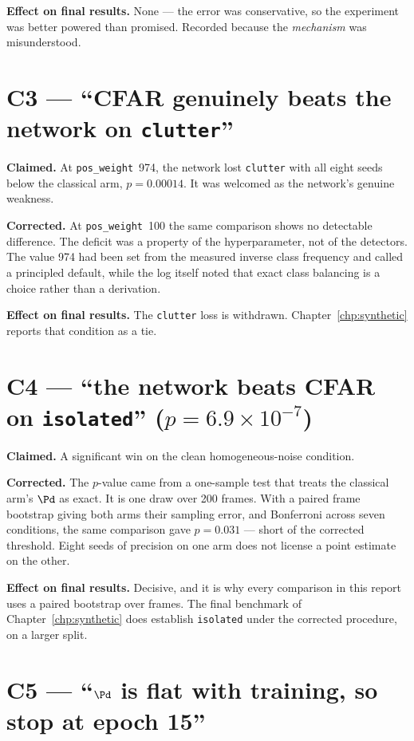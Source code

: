 \textbf{Effect on final results.} None --- the error was conservative, so the experiment was better
powered than promised. Recorded because the \emph{mechanism} was misunderstood.

\section{C3 --- ``CFAR genuinely beats the network on \texttt{clutter}''}

\textbf{Claimed.} At \texttt{pos\_weight}~974, the network lost \texttt{clutter} with all eight
seeds below the classical arm, $p = 0.00014$. It was welcomed as the network's genuine weakness.

\textbf{Corrected.} At \texttt{pos\_weight}~100 the same comparison shows no detectable difference.
The deficit was a property of the hyperparameter, not of the detectors. The value 974 had been set
from the measured inverse class frequency and called a principled default, while the log itself
noted that exact class balancing is a choice rather than a derivation.

\textbf{Effect on final results.} The \texttt{clutter} loss is withdrawn. Chapter~\ref{chp:synthetic}
reports that condition as a tie.

\section{C4 --- ``the network beats CFAR on \texttt{isolated}'' ($p = 6.9\times10^{-7}$)}

\textbf{Claimed.} A significant win on the clean homogeneous-noise condition.

\textbf{Corrected.} The $p$-value came from a one-sample test that treats the classical arm's $\Pd$
as exact. It is one draw over 200 frames. With a paired frame bootstrap giving both arms their
sampling error, and Bonferroni across seven conditions, the same comparison gave $p = 0.031$ ---
short of the corrected threshold. Eight seeds of precision on one arm does not license a point
estimate on the other.

\textbf{Effect on final results.} Decisive, and it is why every comparison in this report uses a
paired bootstrap over frames. The final benchmark of Chapter~\ref{chp:synthetic} does establish
\texttt{isolated} under the corrected procedure, on a larger split.

\section{C5 --- ``$\Pd$ is flat with training, so stop at epoch 15''}

